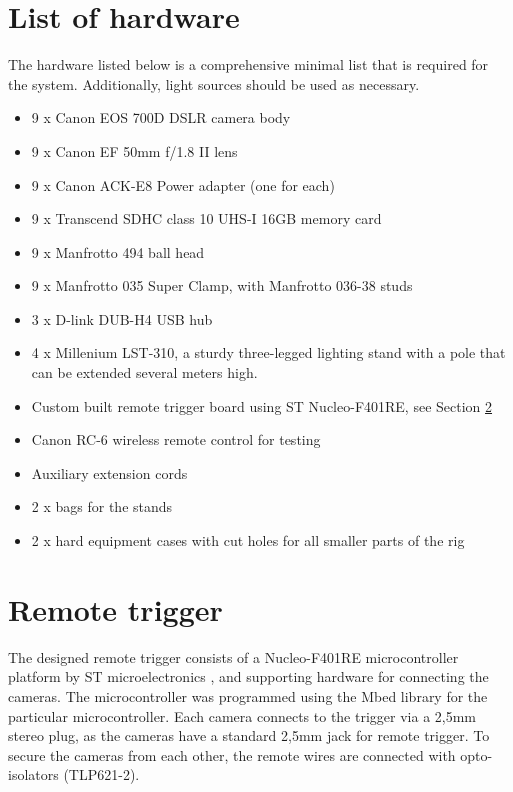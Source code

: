 \section{List of hardware} \label{app:hardwareused}

The hardware listed below is a comprehensive minimal list that is required for the system.
Additionally, light sources should be used as necessary.

\begin{itemize}
	\item 9 x Canon EOS 700D DSLR camera body
	\item 9 x Canon EF 50mm f/1.8 II lens
	\item 9 x Canon ACK-E8 Power adapter (one for each)
	\item 9 x Transcend SDHC class 10 UHS-I 16GB memory card
	\item 9 x Manfrotto 494 ball head
	\item 9 x Manfrotto 035 Super Clamp, with Manfrotto 036-38 studs
	\item 3 x D-link DUB-H4 USB hub
	\item 4 x Millenium LST-310, a sturdy three-legged lighting stand with a pole that can be extended several meters high.
	\item Custom built remote trigger board using ST Nucleo-F401RE, see Section \ref{app:remotetrigger}
	\item Canon RC-6 wireless remote control for testing
	\item Auxiliary extension cords
	\item 2 x bags for the stands
	\item 2 x hard equipment cases with cut holes for all smaller parts of the rig
\end{itemize}


\section{Remote trigger} \label{app:remotetrigger}

The designed remote trigger consists of a Nucleo-F401RE microcontroller platform by ST microelectronics \cite{stnucleo}, and supporting hardware for connecting the cameras.
The microcontroller was programmed using the Mbed library for the particular microcontroller. \cite{mbednucleo}
Each camera connects to the trigger via a 2,5mm stereo plug, as the cameras have a standard 2,5mm jack for remote trigger.
To secure the cameras from each other, the remote wires are connected with opto-isolators (TLP621-2).

